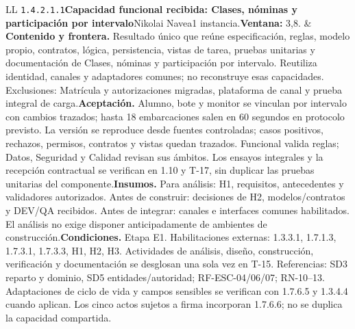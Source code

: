 \begin{longtable}{L{\tabcolsep\relax}L{\tabcolsep\relax}}
\texttt{1.\allowbreak{}4.\allowbreak{}2.\allowbreak{}1.\allowbreak{}1}\newline{}\textbf{Capacidad funcional recibida: Clases, nóminas y participación por intervalo}\newline{}Nikolai Navea\newline{}1 instancia.\newline{}\textbf{Ventana:} 3,8. & \textbf{Contenido y frontera.} Resultado único que reúne especificación, reglas, modelo propio, contratos, lógica, persistencia, vistas de tarea, pruebas unitarias y documentación de Clases, nóminas y participación por intervalo. Reutiliza identidad, canales y adaptadores comunes; no reconstruye esas capacidades. Exclusiones: Matrícula y autorizaciones migradas, plataforma de canal y prueba integral de carga.\newline{}\textbf{Aceptación.} Alumno, bote y monitor se vinculan por intervalo con cambios trazados; hasta 18 embarcaciones salen en 60 segundos en protocolo previsto. La versión se reproduce desde fuentes controladas; casos positivos, rechazos, permisos, contratos y vistas quedan trazados. Funcional valida reglas; Datos, Seguridad y Calidad revisan sus ámbitos. Los ensayos integrales y la recepción contractual se verifican en 1.10 y T-17, sin duplicar las pruebas unitarias del componente.\newline{}\textbf{Insumos.} Para análisis: H1, requisitos, antecedentes y validadores autorizados. Antes de construir: decisiones de H2, modelos/contratos y DEV/QA recibidos. Antes de integrar: canales e interfaces comunes habilitados. El análisis no exige disponer anticipadamente de ambientes de construcción.\newline{}\textbf{Condiciones.} Etapa E1. Habilitaciones externas: 1.3.3.1, 1.7.1.3, 1.7.3.1, 1.7.3.3, H1, H2, H3. Actividades de análisis, diseño, construcción, verificación y documentación se desglosan una sola vez en T-15. Referencias: SD3 reparto y dominio, SD5 entidades/autoridad; RF-ESC-04/06/07; RN-10--13. Adaptaciones de ciclo de vida y campos sensibles se verifican con 1.7.6.5 y 1.3.4.4 cuando aplican. Los cinco actos sujetos a firma incorporan 1.7.6.6; no se duplica la capacidad compartida.\\\hline

\end{longtable}
